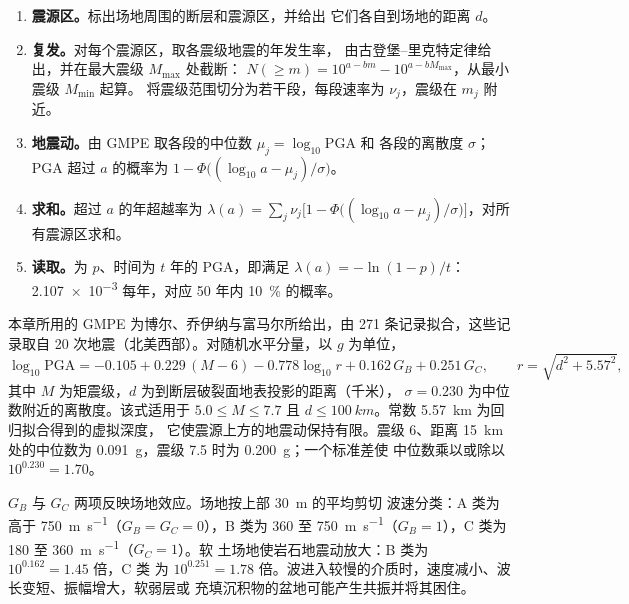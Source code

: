 \begin{method}[概率地震危险性分析]\label{met:b2:geological-hazards:psha}
\begin{enumerate}
  \item \textbf{震源区。}标出场地周围的断层和震源区，并给出
        它们各自到场地的距离 $d$。
  \item \textbf{复发。}对每个震源区，取各震级地震的年发生率，
        由古登堡–里克特定律给出，并在最大震级 $M_{\max}$ 处截断：
        $N(\geq m) = 10^{a - bm} - 10^{a - bM_{\max}}$，从最小震级 $M_{\min}$ 起算。
        将震级范围切分为若干段，每段速率为 $\nu_j$，震级在 $m_j$ 附近。
  \item \textbf{地震动。}由 GMPE 取各段的中位数 $\mu_j = \log_{10}\mathrm{PGA}$ 和
        各段的离散度 $\sigma$；PGA 超过 $a$ 的概率为
        $1 - \Phi\bigl((\log_{10} a - \mu_j)/\sigma\bigr)$。
  \item \textbf{求和。}超过 $a$ 的年超越率为 $\lambda(a) = \sum_j \nu_j
        \bigl[1 - \Phi\bigl((\log_{10} a - \mu_j)/\sigma\bigr)\bigr]$，对所有震源区求和。
  \item \textbf{读取。}为 $p$、时间为 $t$ 年的 PGA，即满足
        $\lambda(a) = -\ln(1 - p)/t$：\num{2.107e-3} 每年，对应 50 年内 \qty{10}{\percent} 的概率。
\end{enumerate}
\end{method}

本章所用的 GMPE 为博尔、乔伊纳与富马尔所给出，由 271 条记录拟合，这些记录取自 20
次地震（北美西部）。对随机水平分量，以 $g$ 为单位，
\begin{equation}
\log_{10}\mathrm{PGA} = -0.105 + 0.229\,(M - 6) - 0.778\log_{10} r + 0.162\,G_B + 0.251\,G_C,
\qquad r = \sqrt{d^2 + 5.57^2},
\label{eq:b2:geological-hazards:gmpe}
\end{equation}
其中 $M$ 为矩震级，$d$ 为到断层破裂面地表投影的距离（千米），
$\sigma = 0.230$ 为中位数附近的离散度。该式适用于 $5.0 \leq M \leq 7.7$ 且 $d
\leq \qty{100}{km}$。常数 \qty{5.57}{km} 为回归拟合得到的虚拟深度，
它使震源上方的地震动保持有限。震级 6、距离 \qty{15}{km} 处的中位数为
\qty{0.091}{g}，震级 7.5 时为 \qty{0.200}{g}；一个标准差使
中位数乘以或除以 $10^{0.230} = 1.70$。

$G_B$ 与 $G_C$ 两项反映场地效应。场地按上部 \qty{30}{m} 的平均剪切
波速分类：A 类为高于 \qty{750}{m.s^{-1}}（$G_B = G_C = 0$），B 类为
360 至 \qty{750}{m.s^{-1}}（$G_B = 1$），C 类为 180 至 \qty{360}{m.s^{-1}}（$G_C = 1$）。软
土场地使岩石地震动放大：B 类为 $10^{0.162} = 1.45$ 倍，C 类
为 $10^{0.251} = 1.78$ 倍。波进入较慢的介质时，速度减小、波长变短、振幅增大，软弱层或
充填沉积物的盆地可能产生共振并将其困住。

